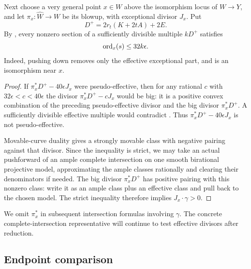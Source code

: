 Next choose a very general point $x\in W$ above the isomorphism locus
of $W\to Y$, and let
$\pi_x:\widehat W\to W$ be its blowup, with exceptional divisor $J_x$.
Put
\[
 D^+=2r_t(K+2tA)+2E.
\]
By , every nonzero section of a sufficiently
divisible multiple $kD^+$ satisfies
\begin{equation}\label{eq:Dplus-order}
 \operatorname{ord}_x(s)\le32k\epsilon.
\end{equation}
Indeed, pushing down removes only the effective exceptional part,
and is an isomorphism near $x$.


\begin{proof}
If $\pi_x^*D^+-40\epsilon J_x$ were pseudo-effective, then for any
rational $c$ with $32\epsilon<c<40\epsilon$ the divisor
$\pi_x^*D^+-cJ_x$ would be big: it is a positive convex combination
of the preceding pseudo-effective divisor and the big divisor
$\pi_x^*D^+$.  A sufficiently divisible effective multiple would
contradict .  Thus
$\pi_x^*D^+-40\epsilon J_x$ is not pseudo-effective.

Movable-curve duality \cite[Theorem~2.2]{BDPP2013} gives a strongly
movable class with negative pairing against that divisor.  Since the
inequality is strict, we may take an actual pushforward of an ample
complete intersection on one smooth birational projective model,
approximating the ample classes rationally and clearing their
denominators if needed.  The big divisor $\pi_x^*D^+$ has positive
pairing with this nonzero class: write it as an ample class plus an
effective class and pull back to the chosen model.  The strict
inequality therefore implies $J_x\cdot\gamma>0$.
\end{proof}

We omit $\pi_x^*$ in subsequent intersection formulas involving
$\gamma$.  The concrete complete-intersection representative will
continue to test effective divisors after reduction.

\subsection{Endpoint comparison}

